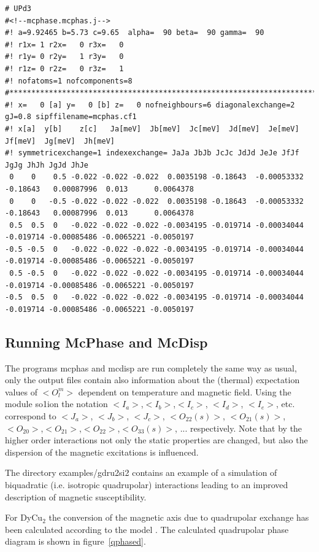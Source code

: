 {\footnotesize \begin{verbatim}
# UPd3 
#<!--mcphase.mcphas.j-->
#! a=9.92465 b=5.73 c=9.65  alpha=  90 beta=  90 gamma=  90
#! r1x= 1 r2x=   0 r3x=   0
#! r1y= 0 r2y=   1 r3y=   0
#! r1z= 0 r2z=   0 r3z=   1
#! nofatoms=1 nofcomponents=8
#*************************************************************************
#! x=   0 [a] y=   0 [b] z=   0 nofneighbours=6 diagonalexchange=2 gJ=0.8 sipffilename=mcphas.cf1
#! x[a]  y[b]    z[c]   Ja[meV]  Jb[meV]  Jc[meV]  Jd[meV]  Je[meV]  Jf[meV]  Jg[meV]  Jh[meV]
#! symmetricexchange=1 indexexchange= JaJa JbJb JcJc JdJd JeJe JfJf JgJg JhJh JgJd JhJe
 0    0    0.5 -0.022 -0.022 -0.022  0.0035198 -0.18643  -0.00053332 -0.18643   0.00087996  0.013      0.0064378
 0    0   -0.5 -0.022 -0.022 -0.022  0.0035198 -0.18643  -0.00053332 -0.18643   0.00087996  0.013      0.0064378
 0.5  0.5  0   -0.022 -0.022 -0.022 -0.0034195 -0.019714 -0.00034044 -0.019714 -0.00085486 -0.0065221 -0.0050197
-0.5 -0.5  0   -0.022 -0.022 -0.022 -0.0034195 -0.019714 -0.00034044 -0.019714 -0.00085486 -0.0065221 -0.0050197
 0.5 -0.5  0   -0.022 -0.022 -0.022 -0.0034195 -0.019714 -0.00034044 -0.019714 -0.00085486 -0.0065221 -0.0050197
-0.5  0.5  0   -0.022 -0.022 -0.022 -0.0034195 -0.019714 -0.00034044 -0.019714 -0.00085486 -0.0065221 -0.0050197
\end{verbatim} }

\subsection{Running {\prg McPhase} and {\prg McDisp}}

The programs {\prg mcphas} and {\prg mcdisp} are run completely the same way as usual, only
the output files contain also information about the (thermal) expectation values of $<O_l^m>$
dependent on temperature and magnetic field. 
Using the module so1ion the notation $<I_a>$,$<I_b>$,$<I_c>$,
$<I_d>$, $<I_e>$, etc. correspond to $<J_a>$, $<J_b>$,
$<J_c>$, $<O_{22}(s)>$, $<O_{21}(s)>$,$<O_{20}>$,$<O_{21}>$,$<O_{22}>$,$<O_{33}(s)>$, ...
 respectively.
Note that by the higher order interactions not only the static properties are changed, but also the
dispersion of the magnetic excitations is influenced.


The directory {\prg examples/gdru2si2} contains an example of a simulation of biquadratic (i.e. isotropic %
quadrupolar) interactions leading to an improved description of magnetic susceptibility.

For DyCu$_2$ the conversion
of the magnetic axis due to quadrupolar exchange has been calculated according to the model 
\cite{yoshida98-1421}. The calculated quadrupolar phase diagram is shown in figure~\ref{qphased}.

